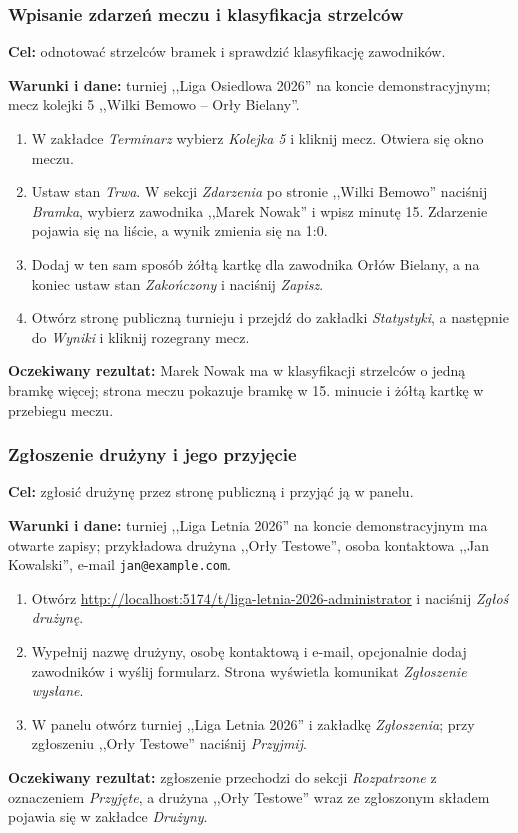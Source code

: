 \documentclass[11pt,a4paper,oneside]{article}
\begin{document}
\subsubsection{Wpisanie zdarzeń meczu i klasyfikacja strzelców}
\textbf{Cel:} odnotować strzelców bramek i sprawdzić klasyfikację zawodników.\par
\textbf{Warunki i dane:} turniej ,,Liga Osiedlowa 2026'' na koncie demonstracyjnym; mecz kolejki 5 ,,Wilki Bemowo -- Orły Bielany''.
\begin{enumerate}
\item W zakładce \emph{Terminarz} wybierz \emph{Kolejka 5} i kliknij mecz. Otwiera się okno meczu.
\item Ustaw stan \emph{Trwa}. W sekcji \emph{Zdarzenia} po stronie ,,Wilki Bemowo'' naciśnij \emph{Bramka}, wybierz zawodnika ,,Marek Nowak'' i wpisz minutę 15. Zdarzenie pojawia się na liście, a wynik zmienia się na 1:0.
\item Dodaj w ten sam sposób żółtą kartkę dla zawodnika Orłów Bielany, a na koniec ustaw stan \emph{Zakończony} i naciśnij \emph{Zapisz}.
\item Otwórz stronę publiczną turnieju i przejdź do zakładki \emph{Statystyki}, a następnie do \emph{Wyniki} i kliknij rozegrany mecz.
\end{enumerate}
\textbf{Oczekiwany rezultat:} Marek Nowak ma w klasyfikacji strzelców o jedną bramkę więcej; strona meczu pokazuje bramkę w 15. minucie i żółtą kartkę w przebiegu meczu.

\subsubsection{Zgłoszenie drużyny i jego przyjęcie}
\textbf{Cel:} zgłosić drużynę przez stronę publiczną i przyjąć ją w panelu.\par
\textbf{Warunki i dane:} turniej ,,Liga Letnia 2026'' na koncie demonstracyjnym ma otwarte zapisy; przykładowa drużyna ,,Orły Testowe'', osoba kontaktowa ,,Jan Kowalski'', e-mail \texttt{jan@example.com}.
\begin{enumerate}
\item Otwórz \url{http://localhost:5174/t/liga-letnia-2026-administrator} i naciśnij \emph{Zgłoś drużynę}.
\item Wypełnij nazwę drużyny, osobę kontaktową i e-mail, opcjonalnie dodaj zawodników i wyślij formularz. Strona wyświetla komunikat \emph{Zgłoszenie wysłane}.
\item W panelu otwórz turniej ,,Liga Letnia 2026'' i zakładkę \emph{Zgłoszenia}; przy zgłoszeniu ,,Orły Testowe'' naciśnij \emph{Przyjmij}.
\end{enumerate}
\textbf{Oczekiwany rezultat:} zgłoszenie przechodzi do sekcji \emph{Rozpatrzone} z oznaczeniem \emph{Przyjęte}, a drużyna ,,Orły Testowe'' wraz ze zgłoszonym składem pojawia się w zakładce \emph{Drużyny}.
\end{document}
